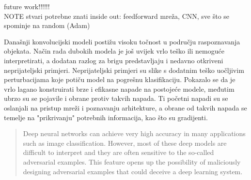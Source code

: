 \documentclass[utf8, diplomski]{fer}
\begin{document}
future work!!!!!! \\
NOTE stvari potrebne znati inside out: feedforward mreža, CNN, sve što se spominje na random (Adam)




\begin{sazetak}
Današnji konvolucijski modeli postižu visoku točnost u području raspoznavanja objekata. Način rada dubokih modela je još uvijek vrlo teško ili nemoguće interpretirati, a dodatan razlog za brigu predstavljaju i nedavno otkriveni neprijateljski primjeri. Neprijateljski primjeri su slike s dodatnim teško uočljivim perturbacijama koje potiču model na pogrešnu klasifikaciju. Pokazalo se da je vrlo lagano konstruirati brze i efikasne napade na postojeće modele, međutim  ubrzo su se pojavile i obrane protiv takvih napada. Ti početni napadi su se oslanjali na pristup mreži i poznavanju arhitekture, a obrane od takvih napada se temelje na "prikrivanju" potrebnih informacija, kao što su gradijenti.

\end{sazetak}

\begin{abstract}
Deep neural networks can achieve very high accuracy in many applications such as image classification. However, most of these deep models are difficult to interpret and they are often sensitive to the so-called adversarial examples. This feature opens up the possibility of maliciously designing adversarial examples that could deceive a deep learning system. 

\end{abstract}
\end{document}
